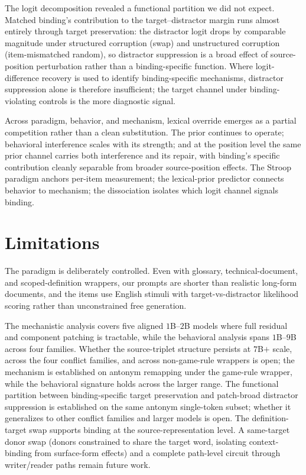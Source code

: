 \documentclass[11pt]{article}
\begin{document}
The logit decomposition revealed a functional partition we did not expect. Matched binding's
contribution to the target--distractor margin runs almost entirely through target
preservation: the distractor logit drops by comparable magnitude under structured corruption
(swap) and unstructured corruption (item-mismatched random), so distractor suppression is a
broad effect of source-position perturbation rather than a binding-specific function. Where
logit-difference recovery is used to identify binding-specific mechanisms, distractor
suppression alone is therefore insufficient; the target channel under binding-violating
controls is the more diagnostic signal.

Across paradigm, behavior, and mechanism, lexical override emerges as a partial competition
rather than a clean substitution. The prior continues to operate; behavioral interference
scales with its strength; and at the position level the same prior channel carries both
interference and its repair, with binding's specific contribution cleanly separable from
broader source-position effects. The Stroop paradigm anchors per-item measurement; the
lexical-prior predictor connects behavior to mechanism; the dissociation isolates which logit
channel signals binding.

\section*{Limitations}

The paradigm is deliberately controlled. Even with glossary, technical-document, and
scoped-definition wrappers, our prompts are shorter than realistic long-form documents, and
the items use English stimuli with target-vs-distractor likelihood scoring rather than
unconstrained free generation.

The mechanistic analysis covers five aligned $1$B--$2$B models where full residual and
component patching is tractable, while the behavioral analysis spans $1$B--$9$B across four
families. Whether the source-triplet structure persists at $7$B$+$ scale, across the four
conflict families, and across non-game-rule wrappers is open; the mechanism is established
on antonym remapping under the game-rule wrapper, while the behavioral signature holds across
the larger range. The functional partition between binding-specific target preservation and
patch-broad distractor suppression is established on the same antonym single-token subset;
whether it generalizes to other conflict families and larger models is open. The
definition-target swap supports binding at the source-representation level. A same-target
donor swap (donors constrained to share the target word, isolating context-binding from
surface-form effects) and a complete path-level circuit through writer/reader paths remain
future work.
\end{document}
